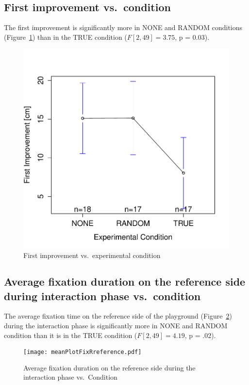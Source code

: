 \documentclass{sig-alternate}
\begin{document}
\subsection{First improvement vs.~condition}

The first improvement is significantly more in NONE and RANDOM
conditions (Figure~\ref{res2}) than in the TRUE condition ($F[2,49]=3.75$, p =
0.03).

\begin{figure}[h!]
    \centering
    \includegraphics[width=0.8\linewidth]{meanPlotFirstImprove.pdf}
    \caption{First improvement vs.~experimental condition}
    \label{res2}
\end{figure}

\subsection{Average fixation duration on the reference side during interaction
phase vs.~condition}

The average fixation time on the reference side of the playground
(Figure~\ref{res3}) during the interaction phase is significantly more in NONE
and RANDOM condition than it is in the TRUE condition ($F[2,49]=4.19$,
p = .02).

\begin{figure}[h!]
    \centering
    \texttt{[image: meanPlotFixRreference.pdf]}
    \caption{Average fixation duration on the reference side during the
    interaction phase vs.~Condition}
    \label{res3}
\end{figure}
\end{document}
